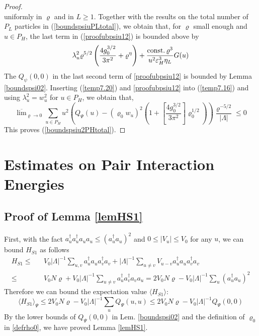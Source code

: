 \documentclass[11pt]{article}
\numberwithin{equation}{section}
\newcommand{\beq}{\begin{equation}}
\newcommand{\eeq}{\end{equation}}
\newcommand{\beqa}{\begin{eqnarray}}
\newcommand{\eeqa}{\end{eqnarray}}
\newcommand\eps{\varepsilon}
\newcommand\const{{\rm const.\, }}
\renewcommand\rho\varrho
\theoremstyle{definition}
\begin{document}
\begin{proof}
\[\]
uniformly in $\rho$ and in $L\geq1$. Together with the results on the total number of $P_L$ particles in (\ref{boundspsiuPLtotal}),
we obtain that, for $\rho$ small enough  and $u\in P_H$, the last term in (\ref{proofubpsiu12}) is bounded above by 
\beqa\label{temp7.20}
 \lambda_u^2\rho^{5/2}\left(\frac{4g^{3/2}_0}{3\pi^2}+\rho^\eta\right)+ \frac{\const\rho^{3}}{u^2\eps_H^{3}\eta_L}G(u)
\eeqa
The $Q_\psi(0,0)$ in the last second term of \eqref{proofubpsiu12} is bounded by Lemma \ref{boundspsi02}. Inserting (\ref{temp7.20}) and \eqref{proofubpsiu12} into (\ref{temp7.16}) and using  $\lambda_u^2=w_u^2$ for $u\in P_H$, we obtain that,
\beq
\overline\lim_{\rho\to0}\sum_{u\in P_H}u^2\left( Q_\Psi(u)\!-\!(\rho_0w_u)^2\left(1+\left[\frac{4g^{3/2}_0}{3\pi^2}\right]\rho_0^{1/2}\right)\!\right)\frac{\rho^{-5/2}}{|\Lambda|}\leq 0
\eeq
This proves  (\ref{boundspsiu2PHtotal}). 
\end{proof}










\section{Estimates on Pair Interaction Energies}




\subsection{Proof of Lemma \ref{lemHS1}}
First, with the fact $a_u^\dagger a_u^\dagger a_ua_u\leq (a_u^\dagger a_u)^2$ and $0\leq |V_u|\leq V_0$ for any $u$, we can bound $H_{S1}$ as follows
\beqa
H_{S1}\leq&& V_0|\Lambda|^{-1}\sum_{u,v} a_u^\dagger a_u a_v^\dagger a_v +|\Lambda|^{-1}\sum_{u\neq v} V_{u-v}a_u^\dagger a_u a_v^\dagger a_v\\\nonumber
\leq &&V_0N\rho+V_0|\Lambda|^{-1}\sum_{u\neq v}a_u^\dagger a_v^\dagger a_va_u=2V_0N\rho-V_0|\Lambda|^{-1}\sum_{u}(a_u^\dagger a_u)^2
\eeqa
Therefore we can bound the expectation value $\langle H_{S1}\rangle$:
\beq
\langle H_{S1}\rangle_\Psi\leq 2V_0N\rho-V_0|\Lambda|^{-1}\sum_{u}Q_\Psi(u,u)\leq 2V_0N\rho-V_0|\Lambda|^{-1}Q_\Psi(0,0)
\eeq
By the lower bounds of $Q_\Psi(0,0)$ in Lem. \ref{boundspsi02} and the definition of $\rho_0$ in \eqref{defrho0}, we have proved Lemma \ref{lemHS1}.
\end{document}
